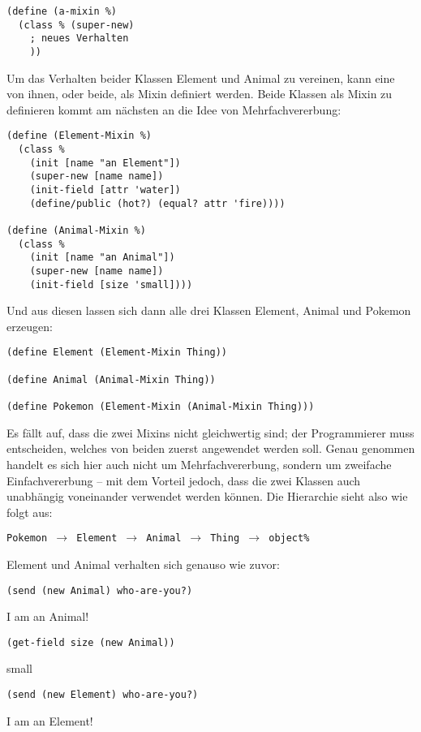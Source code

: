 \begin{lstlisting}
(define (a-mixin %)
  (class % (super-new)
    ; neues Verhalten
    ))
\end{lstlisting}

Um das Verhalten beider Klassen Element und Animal zu vereinen, kann eine von ihnen, oder beide, als Mixin definiert werden. Beide Klassen als Mixin zu definieren kommt am nächsten an die Idee von Mehrfachvererbung:

\begin{lstlisting}
(define (Element-Mixin %)
  (class % 
    (init [name "an Element"])
    (super-new [name name])
    (init-field [attr 'water])
    (define/public (hot?) (equal? attr 'fire))))

(define (Animal-Mixin %)
  (class %
    (init [name "an Animal"])
    (super-new [name name])
    (init-field [size 'small])))
\end{lstlisting}

Und aus diesen lassen sich dann alle drei Klassen Element, Animal und Pokemon erzeugen:
\begin{lstlisting}
(define Element (Element-Mixin Thing))

(define Animal (Animal-Mixin Thing))
 
(define Pokemon (Element-Mixin (Animal-Mixin Thing)))
\end{lstlisting}

Es fällt auf, dass die zwei Mixins nicht gleichwertig sind; der Programmierer muss entscheiden, welches von beiden zuerst angewendet werden soll. Genau genommen handelt es sich hier auch nicht um Mehrfachvererbung, sondern um zweifache Einfachvererbung -- mit dem Vorteil jedoch, dass die zwei Klassen auch unabhängig voneinander verwendet werden können. Die Hierarchie sieht also wie folgt aus:

\texttt{Pokemon $\rightarrow$ Element $\rightarrow$ Animal $\rightarrow$ Thing $\rightarrow$ object\%}

Element und Animal verhalten sich genauso wie zuvor:

\begin{lstlisting}
(send (new Animal) who-are-you?)
\end{lstlisting}
{\routput {\qq}I am an Animal!\qq}

\begin{lstlisting}
(get-field size (new Animal))
\end{lstlisting}
{\rsymbol small}

\begin{lstlisting}
(send (new Element) who-are-you?)
\end{lstlisting}
{\routput {\qq}I am an Element!\qq}

